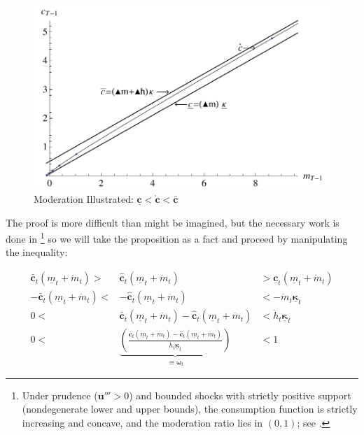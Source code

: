 \documentclass[twocolumn, switch]{article}
\newcommand{\uFunc}{\mathbf{u}}
\newcommand{\mNrm}{m}
\newcommand{\cFunc}{\mathbf{c}}
\newcommand{\cFuncOpt}{\bar{\cFunc}}
\newcommand{\cFuncApprox}{\grave{\cFunc}}
\newcommand{\hNrm}{h}
\newcommand{\MPC}{\boldsymbol{\kappa}}
\newcommand{\MPCmin}{\underline{\MPC}}
\newcommand{\mNrmMin}{\underline{\mNrm}}
\newcommand{\mNrmEx}{\ddot{\mNrm}}
\newcommand{\hNrmEx}{\ddot{\hNrm}}
\newcommand{\cFuncPes}{\underline{\cFunc}}
\newcommand{\cFuncReal}{\hat{\cFunc}}
\newcommand{\modRte}{\boldsymbol{\bar{\omega}}}
\begin{document}
\begin{figure}[!htbp]
\centering
\includegraphics[width=0.8\linewidth]{files/IntExpFOCInvPesReaOp-fb624fab0b4a4099fba4af3d4745d311.pdf}
\caption[]{Moderation Illustrated: $\cFuncPes < \cFuncApprox < \cFuncOpt$}
\label{fig:IntExpFOCInvPesReaOptNeedHi}
\end{figure}

The proof is more difficult than might be imagined, but the necessary work is
done in \citet{CarrollShanker2024}\footnote{Under prudence ($\uFunc''' > 0$) and bounded shocks with strictly positive support
(nondegenerate lower and upper bounds), the consumption function is strictly
increasing and concave, and the moderation ratio lies in $(0,1)$; see \citet{CarrollShanker2024}.} so we will take the proposition as
a fact and proceed by manipulating the inequality:

\begin{equation}
\begin{array}{rcl}
\cFuncOpt_{t}(\mNrmMin_{t}+\mNrmEx_{t}) > & \cFuncReal_{t}(\mNrmMin_{t}+\mNrmEx_{t}) & > \cFuncPes_{t}(\mNrmMin_{t}+\mNrmEx_{t}) \\
-\cFuncOpt_{t}(\mNrmMin_{t}+\mNrmEx_{t}) < & -\cFuncReal_{t}(\mNrmMin_{t}+\mNrmEx_{t}) & < -\mNrmEx_{t} \MPCmin_{t} \\
0 < & \cFuncOpt_{t}(\mNrmMin_{t}+\mNrmEx_{t})-\cFuncReal_{t}(\mNrmMin_{t}+\mNrmEx_{t}) & < \hNrmEx_{t} \MPCmin_{t} \\
0 < & \underbrace{\left(\frac{\cFuncOpt_{t}(\mNrmMin_{t}+\mNrmEx_{t})-\cFuncReal_{t}(\mNrmMin_{t}+\mNrmEx_{t})}{\hNrmEx_{t} \MPCmin_{t}}\right)}_{\equiv \modRte_{t}} & < 1
\end{array}
\end{equation}
\end{document}

